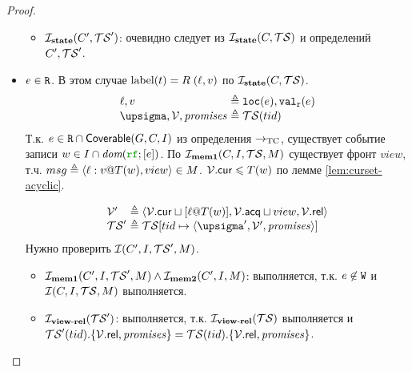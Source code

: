 \begin{proof}
\begin{itemize}
\begin{itemize}
        \item $\mathcal{I}_{\rm \bf state}(C', \mathcal{TS}')$:
          очевидно следует из $\mathcal{I}_{\rm \bf state}(C, \mathcal{TS})$ и определений $C', \mathcal{TS}'$.
      \end{itemize}
        \item $e \in {\mathtt{R}}$. 
          В этом случае ${\rm label}(t) = R \; (\ell, v)$ по $\mathcal{I}_{\rm \bf state}(C, \mathcal{TS})$.
          \[\begin{array}{l@{~}l}
            \loc, \val       & \defeq \lLOC(e), \lVALR(e) \\
            {\pstate, \View, \PromSet} & \defeq \TSf(tid) \\
          \end{array}\]
          Т.к. $e \in {\mathtt{R}} \cap {\sf Coverable}(G, C, I)$ из определения $\rightarrow_{\rm TC}$,
          существует событие записи $w \in \IssuedSet \cap \dom{\lRF; [e]}$. По $\mathcal{I}_{\rm \bf mem1}(C, I, \mathcal{TS}, M)$
          существует фронт $view$, т.ч. $msg \defeq \msg{\loc}{\val}{T(w)}{view} \in M$.
          $\mathcal{V}.{\sf cur} \leqslant T(w)$ по лемме \ref{lem:curset-acyclic}.

          \[\begin{array}{l@{~}l}
            \View'   & \defeq \tup{\View.\viewCur \sqcup [\loc @ T(w)], \View.\viewAcq \sqcup view, \View.\viewRel} \\
            \TSf'    & \defeq \TSf[tid \mapsto \tup{\pstate', \View', \PromSet}] \\
          \end{array}\]
          Нужно проверить $\mathcal{I}(C', I, \mathcal{TS}', M)$.
        \begin{itemize}
        \item $\mathcal{I}_{\rm \bf mem1}(C', I, \mathcal{TS}', M) \land \mathcal{I}_{\rm \bf mem2}(C', I, M)$:
          выполняется, т.к. $e \not\in {\mathtt{W}}$ и $\mathcal{I}(C, I, \mathcal{TS}, M)$ выполняется.

        \item $\mathcal{I}_{\rm \bf view\text{-}rel}(\mathcal{TS}')$: выполняется, т.к. $\mathcal{I}_{\rm \bf view\text{-}rel}(\mathcal{TS})$ выполняется и\\
          $\mathcal{TS}'(tid).\{\mathcal{V}.{\sf rel}, \mathit{promises}\} = \mathcal{TS}(tid).\{\mathcal{V}.{\sf rel}, \mathit{promises}\}$.


\end{itemize}
\end{itemize}
\end{proof}
